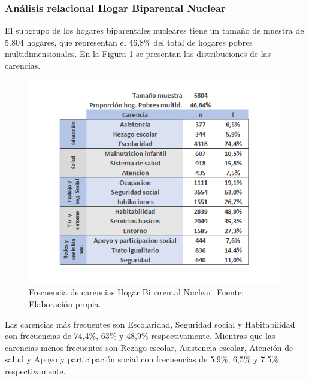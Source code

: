 \documentclass[12pt,letterpaper,spanish]{article}
\begin{document}
\subsubsection{Análisis relacional Hogar Biparental Nuclear}
El subgrupo de los hogares biparentales nucleares tiene un tamaño de muestra de 5.804 hogares, que representan el 46,8\% del total de hogares pobres multidimensionales. En la Figura \ref{freBinuc} se presentan las distribuciones de las carencias.
\begin{figure}[H]
  \centering
    \includegraphics[height=9cm]{HOGARES/tabla_binuc.png}
    \caption{Frecuencia de carencias Hogar Biparental Nuclear. Fuente: Elaboración propia.}
    \label{freBinuc}
\end{figure}
Las carencias más frecuentes son Escolaridad, Seguridad social y Habitabilidad con frecuencias de 74,4\%, 63\% y 48,9\% respectivamente. Mientras que las carencias menos frecuentes son Rezago escolar, Asistencia escolar, Atención de salud y Apoyo y participación social con frecuencias de 5,9\%, 6,5\% y 7,5\% respectivamente.
\end{document}
